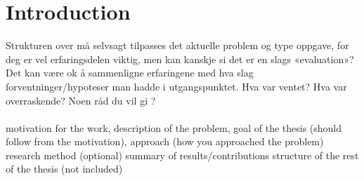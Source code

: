 \documentclass[]{uiophd}
\begin{document}
\chapter{Introduction}
Strukturen over må selvsagt tilpasses det aktuelle problem og type oppgave, for deg er vel erfaringsdelen viktig, men kan kanskje si det er en slags «evaluation»?
Det kan være ok å sammenligne erfaringene med hva slag forventninger/hypoteser man hadde i utgangspunktet.
Hva var ventet? Hva var overraskende? Noen råd du vil gi ?
\\\\
motivation for the work, description of the problem, 
goal of the thesis (should follow from the motivation), 
approach (how you approached the problem)
research method (optional)
summary of results/contributions
structure of the rest of the thesis (not included)
\end{document}

